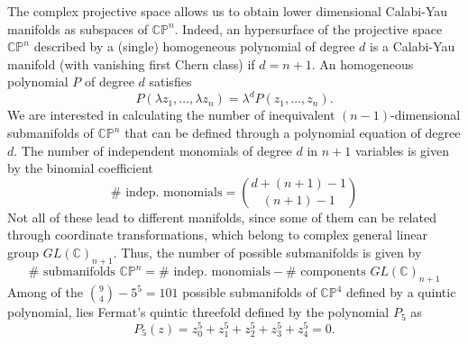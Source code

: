 The complex projective space allows us to obtain lower dimensional Calabi-Yau manifolds as subspaces of $\mathbb{CP}^n$.
Indeed, an hypersurface of the projective space $\mathbb{CP}^n$ described by a (single) homogeneous polynomial of degree $d$ 
is a Calabi-Yau manifold (with vanishing first Chern class) if $d = n+1$. 
An homogeneous polynomial $P$ of degree $d$ satisfies
\begin{equation}
  P(\lambda z_1,\ldots,\lambda z_n)=\lambda^d P(z_1,\ldots,z_n).
\end{equation}
We are interested in calculating the number of inequivalent $(n-1)$-dimensional submanifolds of $\mathbb{CP}^n$ that can be defined
through a polynomial equation of degree $d$.
The number of independent monomials of degree $d$ in $n+1$ variables is given by the binomial coefficient
\begin{equation}
  \# \text{ indep. monomials}={{d+(n+1)-1}\choose{(n+1)-1}}
\end{equation}
Not all of these lead to different manifolds, since some of them can be related through coordinate transformations, 
which belong to complex general linear group $GL(\mathbb C)_{n+1}$.
Thus, the number of possible submanifolds is given by
\begin{equation}
  \# \text{ submanifolds } \mathbb{CP}^n = \# \text{ indep. monomials}-\# \text{ components }GL(\mathbb C)_{n+1}
\end{equation}
Among of the ${{9}\choose{4}}-5^5=101$ possible submanifolds of $\mathbb{CP}^4$ defined by a quintic polynomial, lies
Fermat's quintic threefold defined by the polynomial $P_5$ as
\begin{equation}
  P_5(z) = z_0^5+z_1^5+z_2^5+z_3^5+z_4^5=0.
\end{equation}


